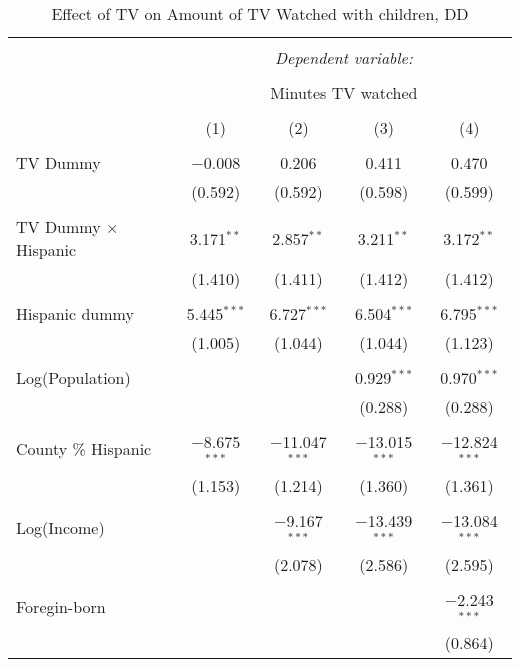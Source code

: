 
\begin{table}[!htbp] \centering 
  \caption{Effect of TV on Amount of TV Watched with children, DD} 
  \label{} 
\begin{tabular}{@{\extracolsep{-5pt}}lcccc} 
\\[-1.8ex]\hline 
\hline \\[-1.8ex] 
 & \multicolumn{4}{c}{\textit{Dependent variable:}} \\ 
\cline{2-5} 
\\[-1.8ex] & \multicolumn{4}{c}{Minutes TV watched} \\ 
\\[-1.8ex] & (1) & (2) & (3) & (4)\\ 
\hline \\[-1.8ex] 
 TV Dummy & $-$0.008 & 0.206 & 0.411 & 0.470 \\ 
  & (0.592) & (0.592) & (0.598) & (0.599) \\ 
  & & & & \\ 
 TV Dummy $\times$ Hispanic  & 3.171$^{**}$ & 2.857$^{**}$ & 3.211$^{**}$ & 3.172$^{**}$ \\ 
  & (1.410) & (1.411) & (1.412) & (1.412) \\ 
  & & & & \\ 
 Hispanic dummy & 5.445$^{***}$ & 6.727$^{***}$ & 6.504$^{***}$ & 6.795$^{***}$ \\ 
  & (1.005) & (1.044) & (1.044) & (1.123) \\ 
  & & & & \\ 
 Log(Population) &  &  & 0.929$^{***}$ & 0.970$^{***}$ \\ 
  &  &  & (0.288) & (0.288) \\ 
  & & & & \\ 
 County \% Hispanic & $-$8.675$^{***}$ & $-$11.047$^{***}$ & $-$13.015$^{***}$ & $-$12.824$^{***}$ \\ 
  & (1.153) & (1.214) & (1.360) & (1.361) \\ 
  & & & & \\ 
 Log(Income) &  & $-$9.167$^{***}$ & $-$13.439$^{***}$ & $-$13.084$^{***}$ \\ 
  &  & (2.078) & (2.586) & (2.595) \\ 
  & & & & \\ 
 Foregin-born &  &  &  & $-$2.243$^{***}$ \\ 
  &  &  &  & (0.864) \\ 

\end{tabular}
\end{table}
